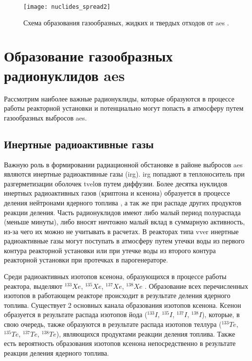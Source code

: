 \begin{figure}[ht]
	\centering
	\texttt{[image: nuclides\_spread2]}
	\captionsetup{justification=centering}
    \caption{Схема образования газообразных, жидких и твердых отходов от \ac{aes} \cite{bekman_nuclear}.}
    \label{fig_nuclides_spread2}
\end{figure}

\section{Образование газообразных радионуклидов \ac{aes}}
\label{sec_gas_nuclides}

Рассмотрим наиболее важные радионуклиды, которые образуются в процессе работы реакторной установки и потенциально 
могут попасть в атмосферу путем газообразных выбросов \ac{aes}. 

\subsection{Инертные радиоактивные газы}

Важную роль в формировании радиационной обстановке в районе выбросов \ac{aes} являются инертные радиоактивные газы 
(\ac{irg}). \ac{irg} попадают в теплоноситель при разгерметизации оболочек \ac{tvel}ов путем диффузии. Более десятка 
нуклидов инертных радиоактивных газов (криптона и ксенона) образуется в процессе деления нейтронами ядерного топлива 
\cite{bekman_nuclear}, а так же при распаде других продуктов реакции деления. Часть радионуклидов имеют либо малый 
период полураспада (меньше минуты), либо вносят ничтожно малый вклад в суммарную активность, из-за чего их можно не 
учитывать в расчетах. В реакторах типа \ac{vver} инертные радиоактивные газы могут поступать в атмосферу путем утечки 
воды из первого контура реакторной установки или при утечке воды из второго контура реакторной установки при протечках в 
парогенераторе.

Среди радиоактивных изотопов ксенона, образующихся в процессе работы реактора, выделяют $^{133}Xe$, $^{135}Xe$, $^{137}Xe$, 
$^{138}Xe$ \cite{gusev_bio}. Образование всех перечисленных изотопов в работающем реакторе происходит в результате деления 
ядерного топлива. Существует 2 основных канала образования изотопов ксенона. Ксенон образуется в результате распада 
изотопов йода ($^{133}I$, $^{135}I$, $^{137}I$, $^{138}I$), которые, в свою очередь, также образуются в результате распада 
изотопов теллура ($^{133}Te$, $^{135}Te$, $^{137}Te$, $^{138}Te$), являющихся продуктами реакции деления топлива. Также 
есть вероятность образования изотопов ксенона непосредственно в результате реакции деления ядерного топлива.

